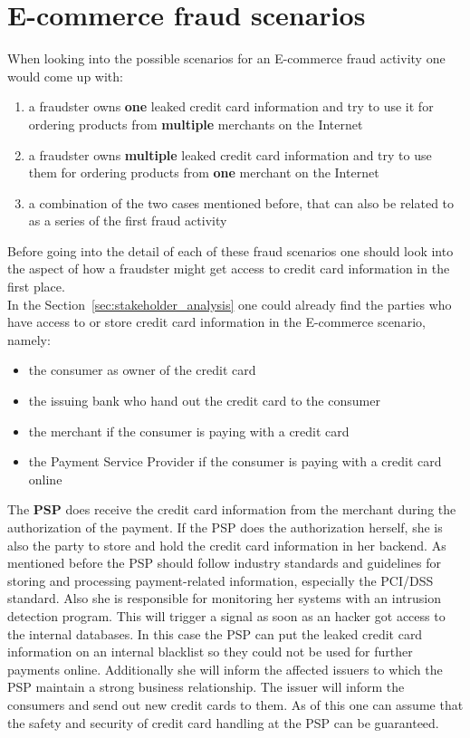 
\section{E-commerce fraud scenarios}
\label{sec:scenario_fraud}

When looking into the possible scenarios for an E-commerce fraud activity one would come up with:\@

\begin{enumerate}
  \item a fraudster owns \textbf{one} leaked credit card information and try to use it for ordering products from \textbf{multiple} merchants on the Internet
  \item a fraudster owns \textbf{multiple} leaked credit card information and try to use them for ordering products from \textbf{one} merchant on the Internet
  \item a combination of the two cases mentioned before, that can also be related to as a series of the first fraud activity
\end{enumerate}

Before going into the detail of each of these fraud scenarios one should look into the aspect of how a fraudster might get access to credit card information in the first place. \\

In the Section~\ref{sec:stakeholder_analysis} one could already find the parties who have access to or store credit card information in the E-commerce scenario, namely:\@

\begin{itemize}
  \item the consumer as owner of the credit card
  \item the issuing bank who hand out the credit card to the consumer
  \item the merchant if the consumer is paying with a credit card
  \item the Payment Service Provider if the consumer is paying with a credit card online
\end{itemize}

The \textbf{\gls{PSP}} does receive the credit card information from the merchant during the authorization of the payment. If the \gls{PSP} does the authorization herself, she is also the party to store and hold the credit card information in her backend. As mentioned before the \gls{PSP} should follow industry standards and guidelines for storing and processing payment-related information, especially the PCI/DSS standard. Also she is responsible for monitoring her systems with an intrusion detection program. This will trigger a signal as soon as an hacker got access to the internal databases. In this case the \gls{PSP} can put the leaked credit card information on an internal blacklist so they could not be used for further payments online. Additionally she will inform the affected issuers to which the \gls{PSP} maintain a strong business relationship. The issuer will inform the consumers and send out new credit cards to them. As of this one can assume that the safety and security of credit card handling at the \gls{PSP} can be guaranteed. \\


